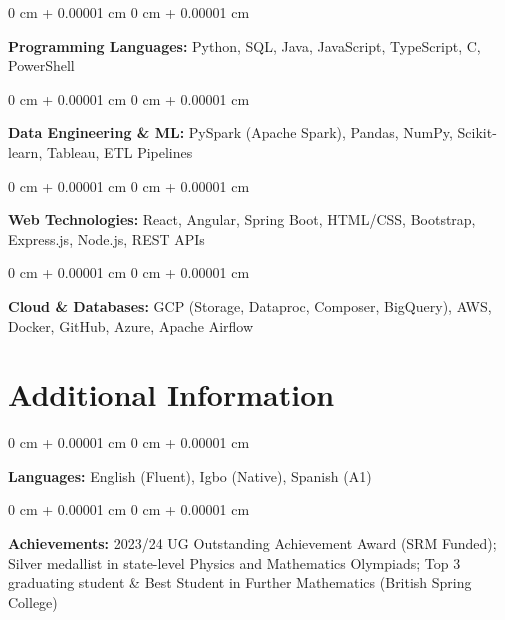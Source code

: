 \documentclass[10pt, a4paper]{article}
\newenvironment{onecolentry}{
    \begin{adjustwidth}{
        0 cm + 0.00001 cm
    }{
        0 cm + 0.00001 cm
    }
}{
    \end{adjustwidth}
} %
\begin{document}
    \begin{onecolentry}
        \textbf{Programming Languages:} Python, SQL, Java, JavaScript, TypeScript, C, PowerShell
    \end{onecolentry}

    \vspace{0.2 cm}

    \begin{onecolentry}
        \textbf{Data Engineering \& ML:} PySpark (Apache Spark), Pandas, NumPy, Scikit-learn, Tableau, ETL Pipelines
    \end{onecolentry}

    \vspace{0.2 cm}

    \begin{onecolentry}
        \textbf{Web Technologies:} React, Angular, Spring Boot, HTML/CSS, Bootstrap, Express.js, Node.js, REST APIs
    \end{onecolentry}

    \vspace{0.2 cm}

    \begin{onecolentry}
        \textbf{Cloud \& Databases:} GCP (Storage, Dataproc, Composer, BigQuery), AWS, Docker, GitHub, Azure, Apache Airflow
    \end{onecolentry}

    \vspace{0.2 cm}

    \section{Additional Information}

    \begin{onecolentry}
        \textbf{Languages:} English (Fluent), Igbo (Native), Spanish (A1)
    \end{onecolentry}

    \vspace{0.1 cm}



    \begin{onecolentry}
        \textbf{Achievements:} 2023/24 UG Outstanding Achievement Award (SRM Funded); Silver medallist in state-level Physics and Mathematics Olympiads; Top 3 graduating student \& Best Student in Further Mathematics (British Spring College)
    \end{onecolentry}

    \vspace{0.2 cm}
\end{document}
